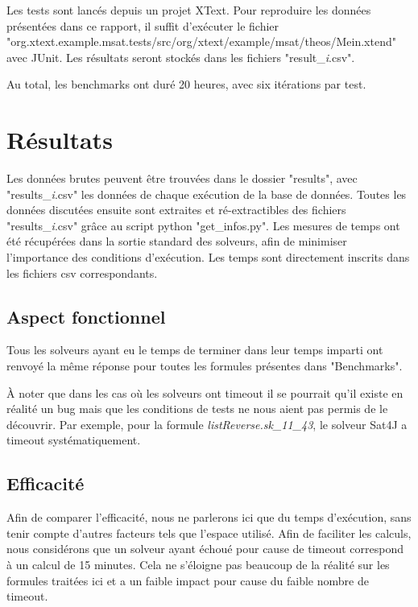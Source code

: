 \documentclass[11pt,a4paper]{article}
\begin{document}
Les tests sont lancés depuis un projet XText. Pour reproduire les données présentées dans ce rapport, il suffit d'exécuter le fichier "org.xtext.example.msat.tests/src/org/xtext/example/msat/theos/Mein.xtend" avec JUnit. Les résultats seront stockés dans les fichiers "result\_\textit{i}.csv".

Au total, les benchmarks ont duré 20 heures, avec six itérations par test.


\section{Résultats}

Les données brutes peuvent être trouvées dans le dossier "results", avec "results\_\textit{i}.csv" les données de chaque exécution de la base de données.
Toutes les données discutées ensuite sont extraites et ré-extractibles des fichiers "results\_\textit{i}.csv" grâce au script python "get\_infos.py". 
Les mesures de temps ont été récupérées dans la sortie standard des solveurs, afin de minimiser l'importance des conditions d'exécution. Les temps sont directement inscrits dans les fichiers csv correspondants.

\subsection{Aspect fonctionnel}

Tous les solveurs ayant eu le temps de terminer dans leur temps imparti ont renvoyé la même réponse pour toutes les formules présentes dans "Benchmarks".

À noter que dans les cas où les solveurs ont timeout il se pourrait qu'il existe en réalité un bug mais que les conditions de tests ne nous aient pas permis de le découvrir. Par exemple, pour la formule \textit{listReverse.sk\_11\_43}, le solveur Sat4J a timeout systématiquement.

\subsection{Efficacité}

Afin de comparer l'efficacité, nous ne parlerons ici que du temps d'exécution, sans tenir compte d'autres facteurs tels que l'espace utilisé. Afin de faciliter les calculs, nous considérons que un solveur ayant échoué pour cause de timeout correspond à un calcul de 15 minutes. Cela ne s'éloigne pas beaucoup de la réalité sur les formules traitées ici et a un faible impact pour cause du faible nombre de timeout.
\end{document}
